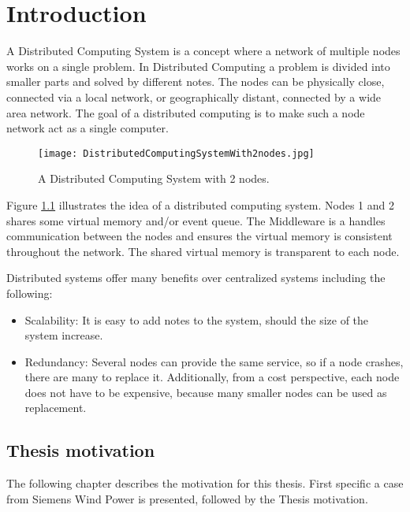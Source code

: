 \chapter{Introduction}

A Distributed Computing System is a concept where a network of multiple nodes works on a single problem. In Distributed Computing a problem is divided into smaller parts and solved by different notes. The nodes can be physically close, connected via a local network, or geographically distant, connected by a wide area network. The goal of a distributed computing is to make such a node network act as a single computer.

\begin{figure}
	\centering
	\texttt{[image: DistributedComputingSystemWith2nodes.jpg]} 
	\caption[Distributed Computing System with 2 nodes]{
		\label{fig:distributedCoputingSystem} 
		\footnotesize{%
			A Distributed Computing System with 2 nodes.
		}
	}
\end{figure}

Figure \cref{fig:distributedCoputingSystem} illustrates the idea of a distributed computing system. Nodes 1 and 2 shares some virtual memory and/or event queue. The Middleware is a handles communication between the nodes and ensures the virtual memory is consistent throughout the network. The shared virtual memory is transparent to each node. 

Distributed systems offer many benefits over centralized systems including the following:
\begin{itemize}
	\item Scalability: It is easy to add notes to the system, should the size of the system increase.
	\item Redundancy: Several nodes can provide the same service, so if a node crashes, there are many to replace it. Additionally, from a cost perspective, each node does not have to be expensive, because many smaller nodes can be used as replacement.
\end{itemize}

\section{Thesis motivation}
The following chapter describes the motivation for this thesis. First specific a case from Siemens Wind Power is presented, followed by the Thesis motivation.

